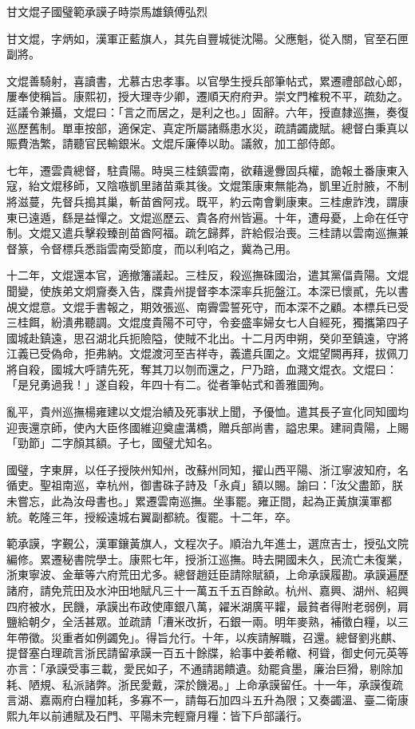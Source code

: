 
\begin{pinyinscope}
甘文焜子國璧範承謨子時崇馬雄鎮傅弘烈

甘文焜，字炳如，漢軍正藍旗人，其先自豐城徙沈陽。父應魁，從入關，官至石匣副將。

文焜善騎射，喜讀書，尤慕古忠孝事。以官學生授兵部筆帖式，累遷禮部啟心郎，屢奉使稱旨。康熙初，授大理寺少卿，遷順天府府尹。崇文門榷稅不平，疏劾之。廷議令兼攝，文焜曰：「言之而居之，是利之也。」固辭。六年，授直隸巡撫，奏復巡歷舊制。單車按部，適保定、真定所屬諸縣患水災，疏請蠲歲賦。總督白秉真以賑費浩繁，請聽官民輸銀米。文焜斥廉俸以助。議敘，加工部侍郎。

七年，遷雲貴總督，駐貴陽。時吳三桂鎮雲南，欲藉邊釁固兵權，詭報土番康東入寇，紿文焜移師，又陰嗾凱里諸苗乘其後。文焜策康東無能為，凱里近肘腋，不制將滋蔓，先督兵搗其巢，斬苗酋阿戎。既平，約云南會剿康東。三桂慮詐洩，謂康東已遠遁，繇是益憚之。文焜巡歷云、貴各府州皆遍。十年，遭母憂，上命在任守制。文焜又遣兵擊殺臻剖苗酋阿福。疏乞歸葬，許給假治喪。三桂請以雲南巡撫兼督篆，令督標兵悉詣雲南受節度，而以利啗之，冀為己用。

十二年，文焜還本官，適撤籓議起。三桂反，殺巡撫硃國治，遣其黨偪貴陽。文焜聞變，使族弟文炯齎奏入告，牒貴州提督李本深率兵扼盤江。本深已懷貳，先以書覘文焜意。文焜手書報之，期效張巡、南霽雲誓死守，而本深不之顧。本標兵已受三桂餌，紛潰弗聽調。文焜度貴陽不可守，令妾盛率婦女七人自經死，獨攜第四子國城赴鎮遠，思召湖北兵扼險隘，使賊不北出。十二月丙申朔，癸卯至鎮遠，守將江義已受偽命，拒弗納。文焜渡河至吉祥寺，義遣兵圍之。文焜望闕再拜，拔佩刀將自殺，國城大呼請先死，奪其刀以刎而還之，尸乃踣，血濺文焜衣。文焜曰：「是兒勇過我！」遂自殺，年四十有二。從者筆帖式和善雅圖殉。

亂平，貴州巡撫楊雍建以文焜治績及死事狀上聞，予優恤。遣其長子宣化同知國均迎喪還京師，使內大臣佟國維迎奠盧溝橋，贈兵部尚書，謚忠果。建祠貴陽，上賜「勁節」二字顏其額。子七，國璧尤知名。

國璧，字東屏，以任子授陜州知州，改蘇州同知，擢山西平陽、浙江寧波知府，名循吏。聖祖南巡，幸杭州，御書硃子詩及「永貞」額以賜。諭曰：「汝父盡節，朕未嘗忘，此為汝母書也。」累遷雲南巡撫。坐事罷。雍正間，起為正黃旗漢軍都統。乾隆三年，授綏遠城右翼副都統。復罷。十二年，卒。

範承謨，字覲公，漢軍鑲黃旗人，文程次子。順治九年進士，選庶吉士，授弘文院編修。累遷秘書院學士。康熙七年，授浙江巡撫。時去開國未久，民流亡未復業，浙東寧波、金華等六府荒田尤多。總督趙廷臣請除賦額，上命承謨履勘。承謨遍歷諸府，請免荒田及水沖田地賦凡三十一萬五千五百餘畝。杭州、嘉興、湖州、紹興四府被水，民饑，承謨出布政使庫銀八萬，糴米湖廣平糶，最貧者得附老弱例，肩鹽給朝夕，全活甚眾。並疏請「漕米改折，石銀一兩。明年麥熟，補徵白糧，以三年帶徵。災重者如例蠲免」。得旨允行。十年，以疾請解職，召還。總督劉兆麒、提督塞白理疏言浙民請留承謨一百五十餘牒，給事中姜希轍、柯聳，御史何元英等亦言：「承謨受事三載，愛民如子，不通請謁饋遺。劾罷貪墨，廉治巨猾，剔除加耗、陋規、私派諸弊。浙民愛戴，深於饑渴。」上命承謨留任。十一年，承謨復疏言湖、嘉兩府白糧加耗，多寡不一，請每石加四斗五升為限；又奏蠲溫、臺二衛康熙九年以前逋賦及石門、平陽未完輕齎月糧：皆下戶部議行。


\end{pinyinscope}
